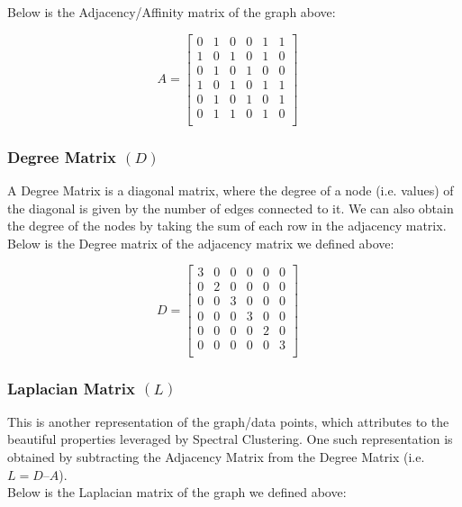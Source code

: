 \documentclass{article}
\begin{document}
        \noindent Below is the Adjacency/Affinity matrix of the graph above:
        
        $$ A = 
    	\begin{bmatrix} 
    	0 & 1 & 0 & 0 & 1 & 1 \\
    	1 & 0 & 1 & 0 & 1 & 0 \\
    	0 & 1 & 0 & 1 & 0 & 0 \\
     	1 & 0 & 1 & 0 & 1 & 1 \\
      	0 & 1 & 0 & 1 & 0 & 1 \\
       	0 & 1 & 1 & 0 & 1 & 0 \\
    	\end{bmatrix}
    	\quad
        $$
        \subsubsection{Degree Matrix $(D)$}
        A Degree Matrix is a diagonal matrix, where the degree of a node (i.e. values) of the diagonal is given by the number of edges connected to it. We can also obtain the degree of the nodes by taking the sum of each row in the adjacency matrix.\\
        
        \noindent Below is the Degree matrix of the adjacency matrix we defined above:
        
        $$ D = 
    	\begin{bmatrix} 
    	3 & 0 & 0 & 0 & 0 & 0 \\
    	0 & 2 & 0 & 0 & 0 & 0 \\
    	0 & 0 & 3 & 0 & 0 & 0 \\
     	0 & 0 & 0 & 3 & 0 & 0 \\
      	0 & 0 & 0 & 0 & 2 & 0 \\
       	0 & 0 & 0 & 0 & 0 & 3 \\
    	\end{bmatrix}
    	\quad
        $$
        \subsubsection{Laplacian Matrix $(L)$}
        This is another representation of the graph/data points, which attributes to the beautiful properties leveraged by Spectral Clustering. One such representation is obtained by subtracting the Adjacency Matrix from the Degree Matrix (i.e. $L = D – A$).\\
        
        \noindent Below is the Laplacian matrix of the graph we defined above:
        
\end{document}
